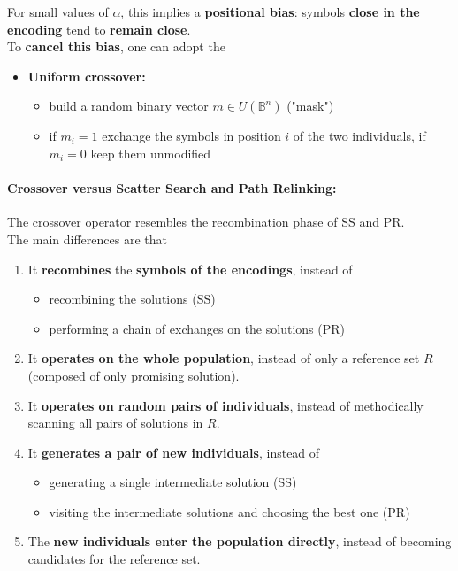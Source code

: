 For small values of $\alpha$, this implies a \textbf{positional bias}: symbols \textbf{close in the encoding} tend to \textbf{remain close}. \\
To \textbf{cancel this bias}, one can adopt the
\begin{itemize}
	\item \textbf{Uniform crossover:}
	\begin{itemize}
		\item build a random binary vector $m \in U(\mathbb{B}^n)$ ("mask")
		\item if $m_i = 1$ exchange the symbols in position $i$ of the two individuals, if $m_i = 0$ keep them unmodified
	\end{itemize}
\end{itemize}

\newpage

\paragraph{Crossover versus Scatter Search and Path Relinking:} The crossover operator resembles the recombination phase of SS and PR.\\

The main differences are that
\begin{enumerate}
	\item It \textbf{recombines} the \textbf{symbols of the encodings}, instead of
	\begin{itemize}
		\item recombining the solutions (SS)
		\item performing a chain of exchanges on the solutions (PR)
	\end{itemize}
	\nn
	
	\item It \textbf{operates on the whole population}, instead of only a reference set $R$ (composed of only promising solution).\\
	
	\item It \textbf{operates on random pairs of individuals}, instead of methodically scanning all pairs of solutions in $R$.\\
	
	\item It \textbf{generates a pair of new individuals}, instead of
	\begin{itemize}
		\item generating a single intermediate solution (SS)
		\item visiting the intermediate solutions and choosing the best one (PR)
	\end{itemize}
	
	\item The \textbf{new individuals enter the population directly}, instead of becoming candidates for the reference set.\\
\end{enumerate}

